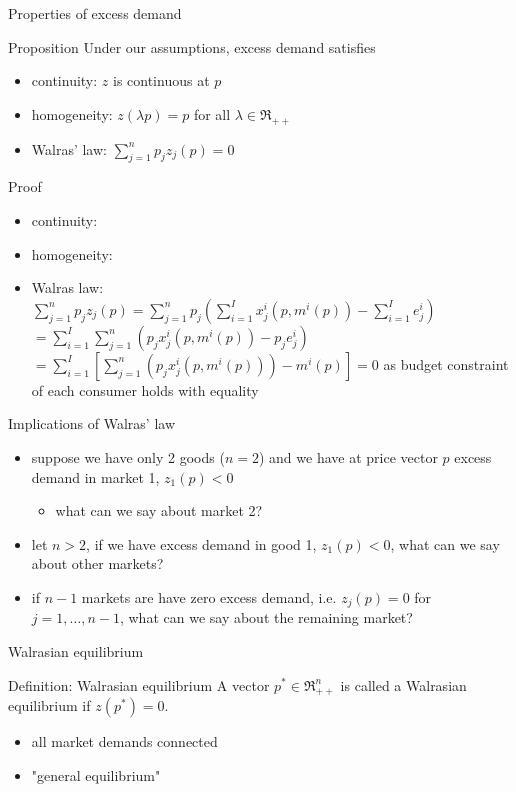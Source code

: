 \documentclass[bigger]{beamer}
\begin{document}
\begin{frame}[label={sec:orgb9745b5}]{Properties of excess demand}
\begin{block}{Proposition}
Under our assumptions, excess demand satisfies
\begin{itemize}
\item continuity: \(z\) is continuous at \(p\)
\item homogeneity: \(z(\lambda p)=p\) for all \(\lambda\in\Re_{++}\)
\item Walras' law: \(\sum_{j=1}^n p_j z_j(p)=0\)
\end{itemize}
\end{block}
\begin{block}{Proof}
\begin{itemize}
\item continuity:
\item homogeneity:
\item Walras law:
\(\sum_{j=1}^n p_j z_j(p)=\sum_{j=1}^n p_j \left( \sum_{i=1}^Ix_j^i(p,m^i(p))-\sum_{i=1}^Ie^i_j  \right)\)
\(= \sum_{i=1}^I \sum_{j=1}^n\left( p_j x_j^i(p,m^i(p))-p_je^i_j\right)\)
\(= \sum_{i=1}^I\left[ \sum_{j=1}^n\left( p_j x_j^i(p,m^i(p))\right)-m^i(p) \right]=0\) as budget constraint of each consumer holds with equality
\end{itemize}
\end{block}
\end{frame}


\begin{frame}[label={sec:org4d7576d}]{Implications of Walras' law}
\begin{itemize}
\item suppose we have only 2 goods (\(n=2\)) and we have at price vector \(p\) excess demand in market 1, \(z_1(p)<0\)
\begin{itemize}
\item what can we say about market 2?
\end{itemize}
\item let \(n>2\), if we have excess demand in good 1, \(z_1(p)<0\), what can we say about other markets?
\item if \(n-1\) markets are have zero excess demand, i.e. \(z_j(p)=0\) for \(j=1,\dots,n-1\), what can we say about the remaining market?
\end{itemize}
\end{frame}

\begin{frame}[label={sec:orgcf10c9d}]{Walrasian equilibrium}
\begin{block}{Definition: Walrasian equilibrium}
A vector \(p^*\in\Re^n_{++}\) is called a Walrasian equilibrium if \(z(p^*)=0\).
\end{block}
\begin{itemize}
\item all market demands connected
\item "general equilibrium"
\end{itemize}
\end{frame}
\end{document}

